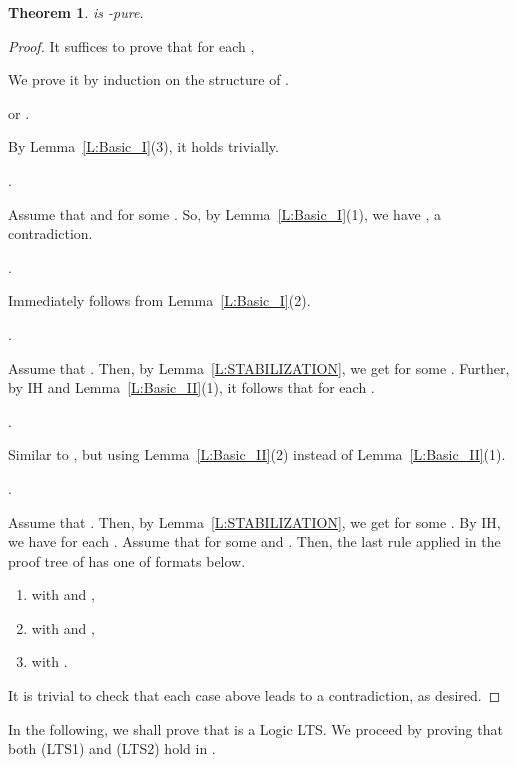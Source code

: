 \documentclass{elsarticle}
\theoremstyle{plain}
\newtheorem{theorem}{Theorem}[section]
\theoremstyle{definition}
\begin{document}
\begin{theorem}\label{L:TAU_PURE}
     is -pure.
\end{theorem}
\begin{proof}
It suffices to prove that for each ,
  
We prove it by induction on the structure of .


\noindent   or .

        By Lemma~\ref{L:Basic_I}(3), it holds trivially.

  \noindent  .

          Assume that  and  for some .
         So, by Lemma~\ref{L:Basic_I}(1), we have , a contradiction.

  \noindent  .

        Immediately follows from Lemma~\ref{L:Basic_I}(2).

  \noindent  .

        Assume that .
        Then, by Lemma~\ref{L:STABILIZATION}, we get  for some . Further, by IH and Lemma~\ref{L:Basic_II}(1), it follows that  for each .

  \noindent  .

        Similar to , but using Lemma~\ref{L:Basic_II}(2) instead of Lemma~\ref{L:Basic_II}(1).

  \noindent  .

        Assume that .
         Then, by Lemma~\ref{L:STABILIZATION}, we get  for some .
         By IH, we have  for each .
         Assume that  for some  and .
         Then, the last rule applied in the proof tree of  has one of formats below.
         \begin{enumerate}
           \item  with  and ,
           \item  with  and ,
           \item  with .
         \end{enumerate}
        It is trivial to check that each case  above leads to a contradiction, as desired.
\end{proof}

In the following, we shall prove that  is a Logic LTS. We proceed by proving that both (LTS1) and (LTS2) hold in .
\end{document}
